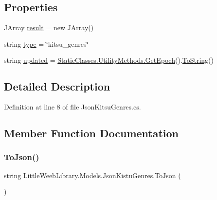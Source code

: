 \subsection*{Properties}
\begin{DoxyCompactItemize}
\item 
J\+Array \mbox{\hyperlink{class_little_weeb_library_1_1_models_1_1_json_kistu_genres_abe59eb4feea93c87e21bd606962f550d}{result}} = new J\+Array()
\item 
string \mbox{\hyperlink{class_little_weeb_library_1_1_models_1_1_json_kistu_genres_a2a4f637bc3bfd761362181d443bfea80}{type}} = \char`\"{}kitsu\+\_\+genres\char`\"{}
\item 
string \mbox{\hyperlink{class_little_weeb_library_1_1_models_1_1_json_kistu_genres_a64039ea4f8a80b3048979813fcce9099}{updated}} = \mbox{\hyperlink{class_little_weeb_library_1_1_static_classes_1_1_utility_methods_a12336d9e64983ddabaad8950486fafb2}{Static\+Classes.\+Utility\+Methods.\+Get\+Epoch}}().\mbox{\hyperlink{class_little_weeb_library_1_1_models_1_1_json_kistu_genres_aff942cf4016346e9df66de3b8c2b7cf6}{To\+String}}()
\end{DoxyCompactItemize}


\subsection{Detailed Description}


Definition at line 8 of file Json\+Kitsu\+Genres.\+cs.



\subsection{Member Function Documentation}
\mbox{\label{class_little_weeb_library_1_1_models_1_1_json_kistu_genres_aad51f41f73ee3bb3f21196e721af3658}} 
\subsubsection{\texorpdfstring{To\+Json()}{ToJson()}}
{\footnotesize\ttfamily string Little\+Weeb\+Library.\+Models.\+Json\+Kistu\+Genres.\+To\+Json (\begin{DoxyParamCaption}{ }\end{DoxyParamCaption})}




